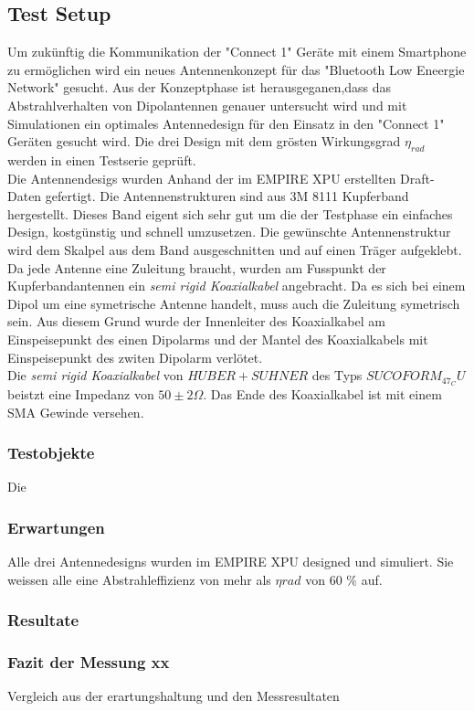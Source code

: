 \subsection{Test Setup}
Um zukünftig die Kommunikation der "Connect 1" Geräte mit einem Smartphone zu ermöglichen wird ein neues Antennenkonzept für das "Bluetooth Low Eneergie Network" gesucht. Aus der Konzeptphase ist herausgeganen,dass das Abstrahlverhalten von Dipolantennen genauer untersucht wird und mit Simulationen ein optimales Antennedesign für den Einsatz in den "Connect 1" Geräten gesucht wird. Die drei Design mit dem grösten Wirkungsgrad $\eta_{rad}$ werden in einen Testserie geprüft.\\
Die Antennendesigs wurden Anhand der im EMPIRE XPU erstellten Draft-Daten gefertigt. Die Antennenstrukturen sind aus 3M 8111 Kupferband hergestellt. Dieses Band eigent sich sehr gut um die der Testphase ein einfaches Design, kostgünstig und schnell umzusetzen. Die gewünschte Antennenstruktur wird dem Skalpel aus dem Band ausgeschnitten und auf einen Träger aufgeklebt. \\
Da jede Antenne eine Zuleitung braucht, wurden am Fusspunkt der Kupferbandantennen ein \textit{semi rigid Koaxialkabel} angebracht. Da es sich bei einem Dipol um eine symetrische Antenne handelt, muss auch die Zuleitung symetrisch sein. Aus diesem Grund wurde der Innenleiter des Koaxialkabel am Einspeisepunkt des einen Dipolarms und der Mantel des Koaxialkabels mit Einspeisepunkt des zwiten Dipolarm verlötet.\\
Die \textit{semi rigid Koaxialkabel} von $HUBER+SUHNER$ des Typs $SUCOFORM_47_CU$ beistzt eine Impedanz von $50  \pm 2\Omega$. Das Ende des Koaxialkabel ist mit einem SMA Gewinde versehen.\\

\subsubsection{Testobjekte}
Die 
\subsubsection{Erwartungen}
Alle drei Antennedesigns wurden im EMPIRE XPU designed und simuliert. Sie weissen alle eine Abstrahleffizienz von mehr als $\eta{rad}$ von 60 $\%$ auf. 
\subsubsection{Resultate}
\subsubsection{Fazit der Messung xx}
Vergleich aus der erartungshaltung und den Messresultaten